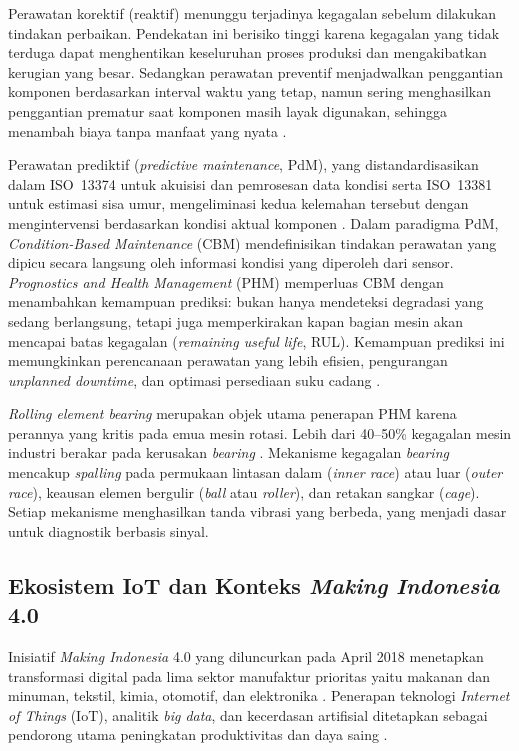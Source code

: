 Perawatan korektif (reaktif) menunggu terjadinya kegagalan sebelum dilakukan
tindakan perbaikan. Pendekatan ini berisiko tinggi karena kegagalan yang tidak
terduga dapat menghentikan keseluruhan proses produksi dan mengakibatkan kerugian
yang besar. Sedangkan perawatan preventif menjadwalkan penggantian komponen berdasarkan
interval waktu yang tetap, namun sering menghasilkan penggantian prematur saat
komponen masih layak digunakan, sehingga menambah biaya tanpa manfaat yang nyata
.

Perawatan prediktif (\emph{predictive maintenance}, PdM), yang
distandardisasikan dalam ISO~13374 untuk akuisisi dan pemrosesan data kondisi
serta ISO~13381 untuk estimasi sisa umur, mengeliminasi kedua kelemahan
tersebut dengan mengintervensi berdasarkan kondisi aktual komponen
. Dalam paradigma PdM, \emph{Condition-Based
Maintenance} (CBM) mendefinisikan tindakan perawatan yang dipicu secara langsung
oleh informasi kondisi yang diperoleh dari sensor. \emph{Prognostics and
Health Management} (PHM) memperluas CBM dengan menambahkan kemampuan prediksi:
bukan hanya mendeteksi degradasi yang sedang berlangsung, tetapi juga
memperkirakan kapan bagian mesin akan mencapai batas kegagalan (\emph{remaining
useful life}, RUL). Kemampuan prediksi ini memungkinkan perencanaan
perawatan yang lebih efisien, pengurangan \emph{unplanned downtime}, dan
optimasi persediaan suku cadang .

\emph{Rolling element bearing} merupakan objek utama penerapan PHM karena perannya yang
kritis pada emua mesin rotasi. Lebih dari 40--50\% kegagalan mesin
industri berakar pada kerusakan \emph{bearing} .
Mekanisme kegagalan \emph{bearing} mencakup \emph{spalling} pada permukaan lintasan
dalam (\emph{inner race}) atau luar (\emph{outer race}), keausan elemen
bergulir (\emph{ball} atau \emph{roller}), dan retakan sangkar (\emph{cage}).
Setiap mekanisme menghasilkan tanda vibrasi yang berbeda, yang menjadi dasar
untuk diagnostik berbasis sinyal.

\subsection{Ekosistem IoT dan Konteks \emph{Making Indonesia} 4.0}
\label{subsec:bab2_iot_industri4}

Inisiatif \emph{Making Indonesia} 4.0 yang diluncurkan pada April 2018
menetapkan transformasi digital pada lima sektor manufaktur prioritas yaitu makanan
dan minuman, tekstil, kimia, otomotif, dan elektronika
. Penerapan teknologi \emph{Internet of Things}
(IoT), analitik \emph{big data}, dan kecerdasan artifisial ditetapkan sebagai
pendorong utama peningkatan produktivitas dan daya saing
.

